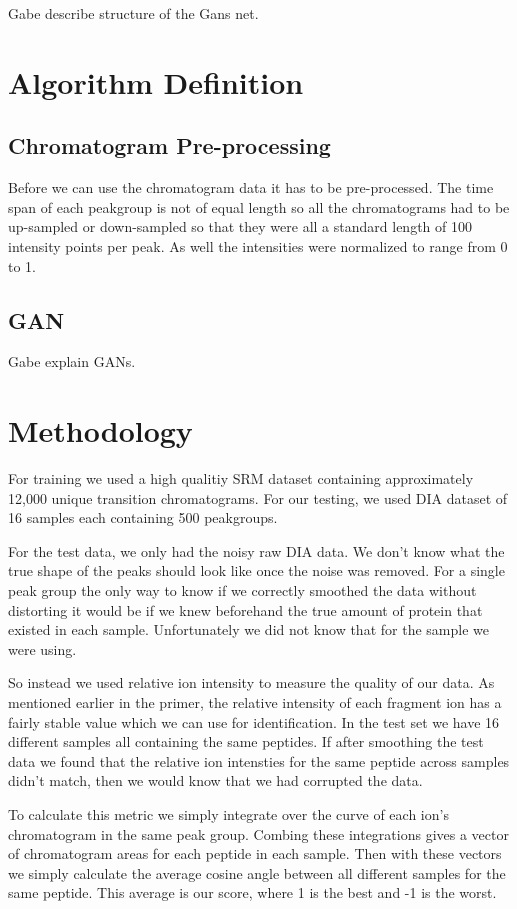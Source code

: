 \documentclass[12pt]{article}
\begin{document}
\color{red}
Gabe describe structure of the Gans net. 
\color{black}
\section{Algorithm Definition}
\subsection{Chromatogram Pre-processing}
Before we can use the chromatogram data it has to be pre-processed. The time span of each peakgroup is not of equal length so all the chromatograms had to be up-sampled or down-sampled so that they were all a standard length of 100 intensity points per peak. As well the intensities were normalized to range from 0 to 1.   
\subsection{GAN}
\color{red}
Gabe explain GANs.
\color{black}
\section{Methodology}
For training we used a high qualitiy SRM dataset\cite{smooth_Data} containing approximately 12,000 unique transition chromatograms. For our testing, we used DIA dataset \cite{TRIC} of 16 samples each containing 500 peakgroups.

For the test data, we only had the noisy raw DIA data. We don't know what the true shape of the peaks should look like once the noise was removed. For a single peak group the only way to know if we correctly smoothed the data without distorting it would be if we knew beforehand the true amount of protein that existed in each sample. Unfortunately we did not know that for the sample we were using. 

So instead we used relative ion intensity to measure the quality of our data. As mentioned earlier in the primer, the relative intensity of each fragment ion has a fairly stable value which we can use for identification. In the test set we have 16 different samples all containing the same peptides. If after smoothing the test data we found that the relative ion intensties for the same peptide across samples didn't match, then we would know that we had corrupted the data. 

To calculate this metric we simply integrate over the curve of each ion's chromatogram in the same peak group. Combing these integrations gives a vector of chromatogram areas for each peptide in each sample. Then with these vectors we simply calculate the average cosine angle between all different samples for the same peptide. This average is our score, where 1 is the best and -1 is the worst.
\end{document}
